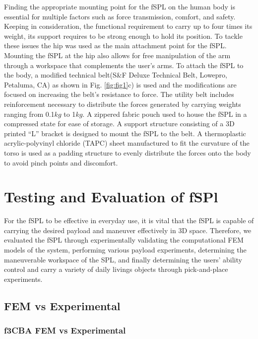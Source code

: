 \documentclass[letterpaper, 10 pt, conference]{ieeeconf}  %
\begin{document}
Finding the appropriate mounting point for the fSPL on the human body is essential for multiple factors such as force transmission, comfort, and safety. Keeping in consideration, the functional requirement to carry up to four times its weight, its support requires to be strong enough to hold its position. To tackle these issues the hip was used as the main attachment point for the fSPL. Mounting the fSPL at the hip also allows for free manipulation of the arm through a workspace that complements the user's arms. To attach the fSPL to the body, a modified technical belt(S\&F Deluxe Technical Belt, Lowepro, Petaluma, CA) as shown in Fig. \ref{fig:fig1}c) is used and the modifications are focused on increasing the belt's resistance to force. The utility belt includes reinforcement necessary to distribute the forces generated by carrying weights ranging from 0.1$kg$ to 1$kg$. A zippered fabric pouch used to house the fSPL in a compressed state for ease of storage. A support structure consisting of a 3D printed “L” bracket is designed to mount the fSPL to the belt. A thermoplastic acrylic-polyvinyl chloride (TAPC) sheet manufactured to fit the curvature of the torso is used as a padding structure to evenly distribute the forces onto the body to avoid pinch points and discomfort.

\section{Testing and Evaluation of fSPl}
For the fSPL to be effective in everyday use, it is vital that the fSPL is capable of carrying the desired payload and maneuver effectively in 3D space. Therefore, we evaluated the fSPL through experimentally validating the computational FEM models of the system, performing various payload experiments, determining the maneuverable workspace of the SPL, and finally determining the users' ability control and carry a variety of daily livings objects through pick-and-place experiments.

\subsection{FEM vs Experimental}

\subsubsection{f3CBA FEM vs Experimental}
\end{document}
